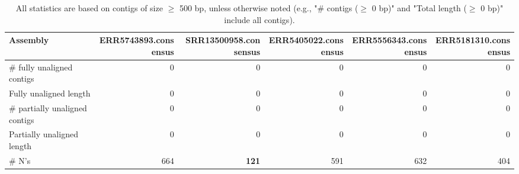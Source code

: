 \documentclass[12pt,a4paper]{article}
\begin{document}
\begin{table}[ht]
\begin{center}
\caption{All statistics are based on contigs of size $\geq$ 500 bp, unless otherwise noted (e.g., "\# contigs ($\geq$ 0 bp)" and "Total length ($\geq$ 0 bp)" include all contigs).}
\begin{tabular}{|l*{5}{|r}|}
\hline
Assembly & ERR5743893.consensus & SRR13500958.consensus & ERR5405022.consensus & ERR5556343.consensus & ERR5181310.consensus \\ \hline
\# fully unaligned contigs & 0 & 0 & 0 & 0 & 0 \\ \hline
Fully unaligned length & 0 & 0 & 0 & 0 & 0 \\ \hline
\# partially unaligned contigs & 0 & 0 & 0 & 0 & 0 \\ \hline
Partially unaligned length & 0 & 0 & 0 & 0 & 0 \\ \hline
\# N's & 664 & {\bf 121} & 591 & 632 & 404 \\ \hline
\end{tabular}
\end{center}
\end{table}
\end{document}
